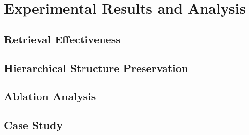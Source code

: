 \newpage

\section{Experimental Results and Analysis}
\label{sec:06_results}

\subsection{Retrieval Effectiveness}

\subsection{Hierarchical Structure Preservation}

\subsection{Ablation Analysis}

\subsection{Case Study}
